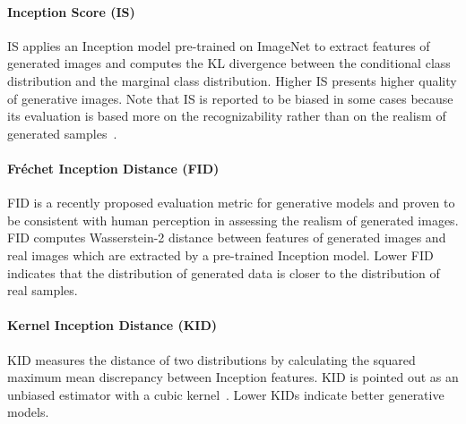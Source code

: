 \paragraph{Inception Score (IS)}
IS applies an Inception model pre-trained on ImageNet to extract features of generated images and computes the KL divergence between the conditional class distribution and the marginal class distribution. Higher IS presents higher quality of generative images.
Note that IS is reported to be biased in some cases because its evaluation is based more on the recognizability rather than on the realism of generated samples~\cite{evaluation}. 

\paragraph{Fréchet Inception Distance (FID)}
FID is a recently proposed evaluation metric for generative models and proven to be consistent with human perception in assessing the realism of generated images. FID computes Wasserstein-2 distance between features of generated images and real images which are extracted by a pre-trained Inception model. Lower FID indicates that the distribution of generated data is closer to the distribution of real samples.

\paragraph{Kernel Inception Distance (KID)}
KID measures the distance of two distributions by calculating the squared maximum mean discrepancy between Inception features. KID is pointed out as an unbiased estimator with a cubic kernel~\cite{KID}. Lower KIDs indicate better generative models.



